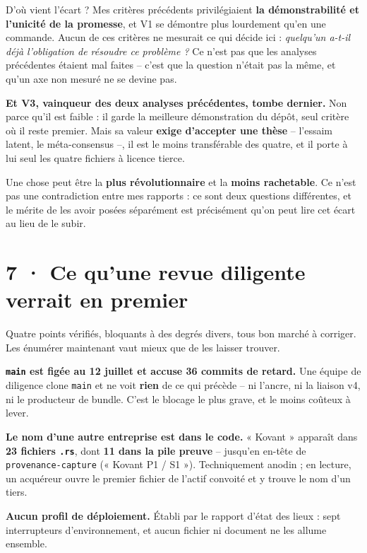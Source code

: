 \documentclass[10pt]{article}
\newcommand{\code}[1]{\texttt{\small #1}}
\begin{document}
D'où vient l'écart ? Mes critères précédents privilégiaient \textbf{la démonstrabilité et l'unicité de
la promesse}, et V1 se démontre plus lourdement qu'en une commande. Aucun de ces critères ne mesurait
ce qui décide ici : \emph{quelqu'un a-t-il déjà l'obligation de résoudre ce problème ?} Ce n'est pas
que les analyses précédentes étaient mal faites -- c'est que la question n'était pas la même, et qu'un
axe non mesuré ne se devine pas.

\textbf{Et V3, vainqueur des deux analyses précédentes, tombe dernier.} Non parce qu'il est faible : il
garde la meilleure démonstration du dépôt, seul critère où il reste premier. Mais sa valeur
\textbf{exige d'accepter une thèse} -- l'essaim latent, le méta-consensus --, il est le moins
transférable des quatre, et il porte à lui seul les quatre fichiers à licence tierce.

\begin{piste}
Une chose peut être la \textbf{plus révolutionnaire} et la \textbf{moins rachetable}. Ce n'est pas une
contradiction entre mes rapports : ce sont deux questions différentes, et le mérite de les avoir posées
séparément est précisément qu'on peut lire cet écart au lieu de le subir.
\end{piste}

\section{7 · Ce qu'une revue diligente verrait en premier}

Quatre points vérifiés, bloquants à des degrés divers, tous bon marché à corriger. Les énumérer
maintenant vaut mieux que de les laisser trouver.

\textbf{\code{main} est figée au 12 juillet et accuse 36 commits de retard.} Une équipe de diligence
clone \code{main} et ne voit \textbf{rien} de ce qui précède -- ni l'ancre, ni la liaison v4, ni le
producteur de bundle. C'est le blocage le plus grave, et le moins coûteux à lever.

\textbf{Le nom d'une autre entreprise est dans le code.} « Kovant » apparaît dans \textbf{23 fichiers
\code{.rs}}, dont \textbf{11 dans la pile preuve} -- jusqu'en en-tête de \code{provenance-capture}
(« Kovant P1 / S1 »). Techniquement anodin ; en lecture, un acquéreur ouvre le premier fichier de
l'actif convoité et y trouve le nom d'un tiers.

\textbf{Aucun profil de déploiement.} Établi par le rapport d'état des lieux : sept interrupteurs
d'environnement, et aucun fichier ni document ne les allume ensemble.
\end{document}
